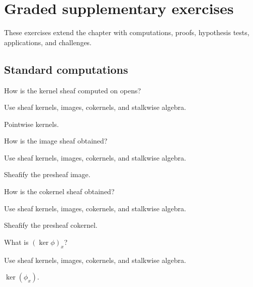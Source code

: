\section{Graded supplementary exercises}
These exercises extend the chapter with computations, proofs, hypothesis tests, applications, and challenges.

\subsection*{Standard computations}

\begin{exercise}[Kernel]\label{exr:vi15-expand-01}
How is the kernel sheaf computed on opens?
\end{exercise}
\begin{hint}
Use sheaf kernels, images, cokernels, and stalkwise algebra.
\end{hint}
\begin{solution}
Pointwise kernels.
\end{solution}

\begin{exercise}[Image]\label{exr:vi15-expand-02}
How is the image sheaf obtained?
\end{exercise}
\begin{hint}
Use sheaf kernels, images, cokernels, and stalkwise algebra.
\end{hint}
\begin{solution}
Sheafify the presheaf image.
\end{solution}

\begin{exercise}[Cokernel]\label{exr:vi15-expand-03}
How is the cokernel sheaf obtained?
\end{exercise}
\begin{hint}
Use sheaf kernels, images, cokernels, and stalkwise algebra.
\end{hint}
\begin{solution}
Sheafify the presheaf cokernel.
\end{solution}

\begin{exercise}\label{exr:vi15-expand-04}
What is $(\ker\phi)_x$?
\end{exercise}
\begin{hint}
Use sheaf kernels, images, cokernels, and stalkwise algebra.
\end{hint}
\begin{solution}
$\ker(\phi_x)$.
\end{solution}

